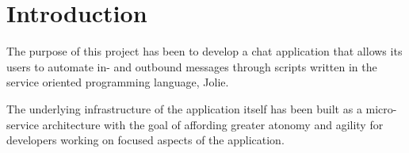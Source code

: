 
\section{Introduction}\label{sec:introduction}
The purpose of this project has been to develop a chat application that allows its users to automate in- and outbound messages through scripts written in the service oriented programming language, Jolie.

The underlying infrastructure of the application itself has been built as a micro-service architecture with the goal of affording greater atonomy and agility for developers working on focused aspects of the application.